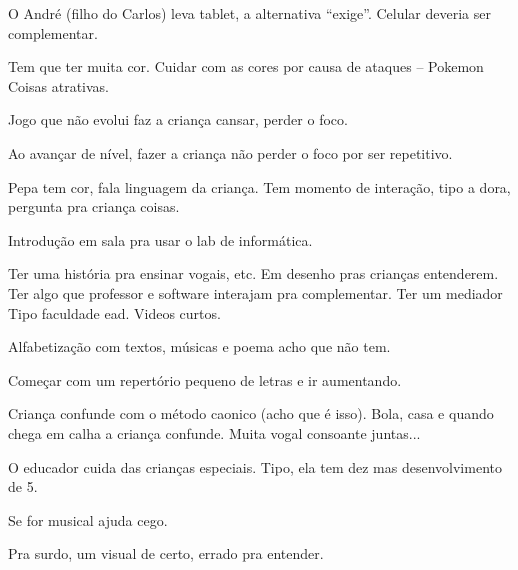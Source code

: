 \documentclass{sigchi}
\begin{document}
O André (filho do Carlos) leva tablet, a alternativa “exige”. Celular deveria ser complementar.

Tem que ter muita cor. Cuidar com as cores por causa de ataques – Pokemon
Coisas atrativas. 

Jogo que não evolui faz a criança cansar, perder o foco.

Ao avançar de nível, fazer a criança não perder o foco por ser repetitivo.

Pepa tem cor, fala linguagem da criança. Tem momento de interação, tipo a dora, pergunta pra criança coisas.

Introdução em sala pra usar o lab de informática.

Ter uma história pra ensinar vogais, etc. Em desenho pras crianças entenderem. Ter algo que professor e software interajam pra complementar. Ter um mediador
Tipo faculdade ead. Videos curtos.

Alfabetização com textos, músicas e poema acho que não tem.

Começar com um repertório pequeno de letras e ir aumentando.

Criança confunde com o método caonico (acho que é isso). Bola, casa e quando chega em calha a criança confunde. Muita vogal consoante juntas...

O educador cuida das crianças especiais. Tipo, ela tem dez mas desenvolvimento de 5.

Se for musical ajuda cego.

Pra surdo, um visual de certo, errado pra entender.

\balance{}



\end{document}
